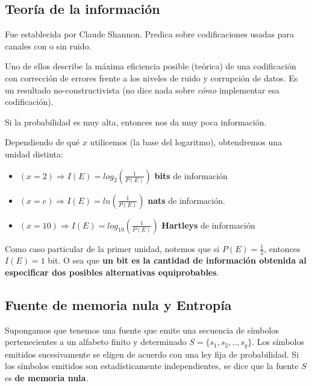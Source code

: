 \documentclass[]{article}
\begin{document}
\subsection{Teoría de la información}
Fue establecida por Claude Shannon. Predica sobre codificaciones usadas para canales con o sin ruido.

Uno de ellos describe la máxima eficiencia posible (teórica) de una codificación con corrección de errores frente a los niveles de ruido y corrupción de datos. Es un resultado no-constructivista (no dice nada sobre \emph{cómo} implementar esa codificación).


Si la probabilidad es muy alta, entonces nos da muy poca información.

Dependiendo de qué $x$ utilicemos (la base del logaritmo), obtendremos una unidad distinta:
\begin{itemize}
    \item $(x = 2) \Rightarrow I(E) = log_2(\frac{1}{P(E)})$ \textbf{bits} de información
    \item $(x = e) \Rightarrow I(E) = ln(\frac{1}{P(E)})$ \textbf{nats} de información.
    \item $(x = 10) \Rightarrow I(E) = log_{10}(\frac{1}{P(E)})$ \textbf{Hartleys} de información
\end{itemize}


Como caso particular de la primer unidad, notemos que si $P(E) = \frac{1}{2}$, entonces $I(E) = 1$ bit. O sea que \textbf{un bit es la cantidad de información obtenida al especificar dos posibles alternativas equiprobables}.

\subsection{Fuente de memoria nula y Entropía}
Supongamos que tenemos una fuente que emite una secuencia de símbolos pertenecientes a un alfabeto finito y determinado $S = \{s_1, s_2, .., s_q\}$. Los símbolos emitidos sucesivamente se eligen de acuerdo con una ley fija de probabilidad. Si los símbolos emitidos son estadísticamente independientes, se dice que la fuente $S$ es \textbf{de memoria nula}.
\end{document}
